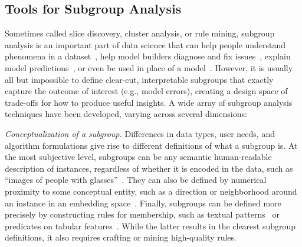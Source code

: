 \subsection{Tools for Subgroup Analysis}
\label{sec:related-subgroup-analysis}

Sometimes called slice discovery, cluster analysis, or rule mining, subgroup analysis is an important part of data science that can help people understand phenomena in a dataset~\cite{liu_exploratory_2020,gamberger_active_2003}, help model builders diagnose and fix issues~\cite{piorkowski_aimee_2023,zhang_drml_2022,cabrera2021deblinder,robertson_angler_2023,zhang_sliceteller_2022, jain_distilling_2022}, explain model predictions~\cite{ribeiro_anchors_2018}, or even be used in place of a model~\cite{lavrac_decision_2004}.
However, it is usually all but impossible to define clear-cut, interpretable subgroups that exactly capture the outcome of interest (e.g., model errors), creating a design space of trade-offs for how to produce useful insights.
A wide array of subgroup analysis techniques have been developed, varying across several dimensions:

\textit{Conceptualization of a subgroup.} Differences in data types, user needs, and algorithm formulations give rise to different definitions of what a subgroup is. 
At the most subjective level, subgroups can be any semantic human-readable description of instances, regardless of whether it is encoded in the data, such as ``images of people with glasses''~\cite{cabrera2021deblinder}. 
They can also be defined by numerical proximity to some conceptual entity, such as a direction or neighborhood around an instance in an embedding space~\cite{eyuboglu_domino_2022,kim_interpretability_2018,ahn_escape_2023}. 
Finally, subgroups can be defined more precisely by constructing rules for membership, such as textual patterns~\cite{wu_errudite_2020,robertson_angler_2023} or predicates on tabular features~\cite{kwon_rmexplorer_2022,hurley_interactive_2022}. 
While the latter results in the clearest subgroup definitions, it also requires crafting or mining high-quality rules.

